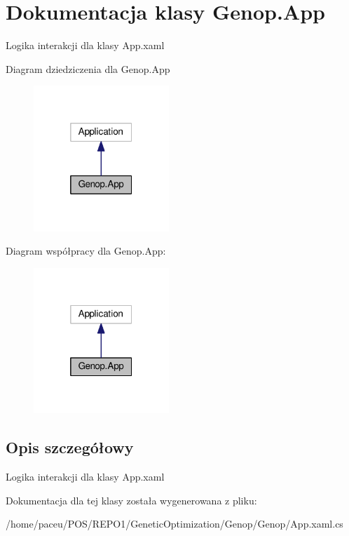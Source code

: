 \hypertarget{classGenop_1_1App}{}\section{Dokumentacja klasy Genop.\+App}
\label{classGenop_1_1App}


Logika interakcji dla klasy App.\+xaml  




Diagram dziedziczenia dla Genop.\+App
\nopagebreak
\begin{figure}[H]
\begin{center}
\leavevmode
\includegraphics[width=145pt]{d1/d9b/classGenop_1_1App__inherit__graph}
\end{center}
\end{figure}


Diagram współpracy dla Genop.\+App\+:
\nopagebreak
\begin{figure}[H]
\begin{center}
\leavevmode
\includegraphics[width=145pt]{dd/de4/classGenop_1_1App__coll__graph}
\end{center}
\end{figure}


\subsection{Opis szczegółowy}
Logika interakcji dla klasy App.\+xaml 



Dokumentacja dla tej klasy została wygenerowana z pliku\+:\begin{DoxyCompactItemize}
\item 
/home/paceu/\+P\+O\+S/\+R\+E\+P\+O1/\+Genetic\+Optimization/\+Genop/\+Genop/App.\+xaml.\+cs\end{DoxyCompactItemize}
